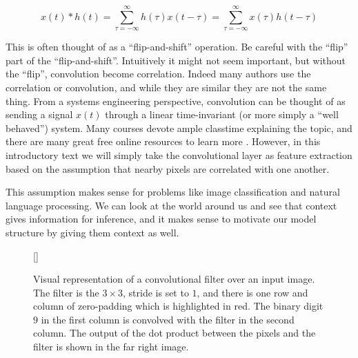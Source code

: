 \documentclass[11pt]{article}
\begin{document}
\begin{equation} \label{eq:conv_def}
  x(t) * h(t) = \sum_{\tau=-\infty}^{\infty}h(\tau)x(t-\tau) = \sum_{\tau=-\infty}^{\infty}x(\tau)h(t-\tau)
\end{equation}

This is often thought of as a ``flip-and-shift'' operation. Be careful with the ``flip'' part of the ``flip-and-shift''. Intuitively it might not seem important, but without the ``flip'', convolution become correlation. Indeed many authors use the correlation or convolution, and while they are similar they are not the same thing. From a systems engineering perspective, convolution can be thought of as sending a signal $x(t)$ through a linear time-invariant (or more simply a ``well behaved'') system. Many courses devote ample classtime explaining the topic, and there are many great free online resources to learn more \cite{joyofconv}. However, in this introductory text we will simply take the convolutional layer as feature extraction based on the assumption that nearby pixels are correlated with one another. 

This assumption makes sense for problems like image classification and natural language processing. We can look at the world around us and see that context gives information for inference, and it makes sense to motivate our model structure by giving them context as well. 

\begin{figure}[H]
  [\FBwidth]
  {\caption{Visual representation of a convolutional filter over an input image. The filter is the $3\times3$, stride is set to $1$, and there is one row and column of zero-padding which is highlighted in red. The binary digit $9$ in the first column is convolved with the filter in the second column. The output of the dot product between the pixels and the filter is shown in the far right image.}\label{fig:conv_ex}}{}
\end{figure}
\end{document}
